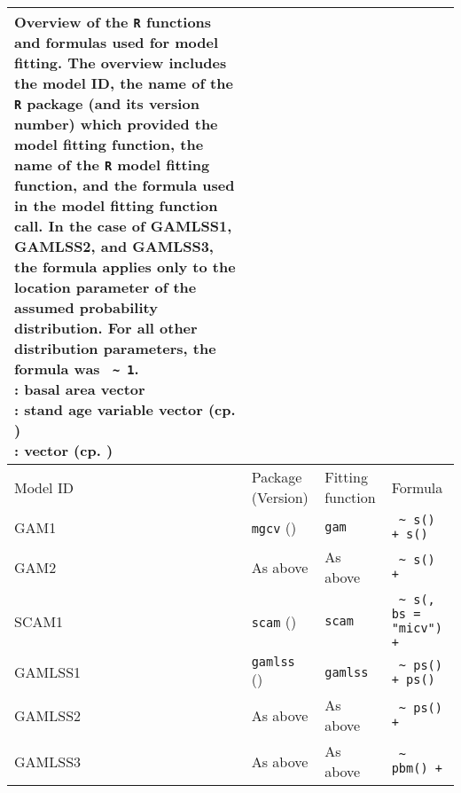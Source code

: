 \begin{table}[H]
  {\tabulinesep=2mm
    \begin{longtabu}{L l l l}
      \caption{Overview of the \texttt{R} functions and formulas used for model fitting. The overview includes
        the model ID,
        the name of the \texttt{R} package (and its version number) which provided the model fitting function,
        the name of the \texttt{R} model fitting function,
        and the formula used in the model fitting function call.
        In the case of GAMLSS1, GAMLSS2, and GAMLSS3, the formula applies only to the location parameter of the assumed probability distribution.
        For all other distribution parameters, the formula was \texttt{\BasalAreaR{} \textasciitilde{} 1}. \\
        \BasalAreaR{}: basal area vector \\
        \StandAgeVariableR{}: stand age variable vector (cp. ) \\
        \ProductivityIndexVariableR{}: \ProductivityIndexVariableText{} vector (cp. )
        \label{tab:PresentedModelsOverviewFormulas}} \\
      \toprule
      Model ID & Package (Version) & Fitting function & Formula \\
      \midrule
      \endhead
      \bottomrule
      \endlastfoot
      GAM1 & \texttt{mgcv} (\mgcvPackageVersion{}) & \texttt{gam} & \texttt{\BasalAreaR{} \textasciitilde{} s(\StandAgeVariableR{}) + s(\ProductivityIndexVariableR{})} \\
      GAM2 & As above & As above & \texttt{\BasalAreaR{} \textasciitilde{} s(\StandAgeVariableR{}) + \ProductivityIndexVariableR{}} \\
      SCAM1 & \texttt{scam} (\scamPackageVersion{}) & \texttt{scam} & \texttt{\BasalAreaR{} \textasciitilde{} s(\StandAgeVariableR{}, bs = "micv") + \ProductivityIndexVariableR{}} \\
      GAMLSS1 & \texttt{gamlss} (\gamlssPackageVersion{}) & \texttt{gamlss} & \texttt{\BasalAreaR{} \textasciitilde{} ps(\StandAgeVariableR{}) + ps(\ProductivityIndexVariableR{})} \\
      GAMLSS2 & As above & As above & \texttt{\BasalAreaR{} \textasciitilde{} ps(\StandAgeVariableR{}) + \ProductivityIndexVariableR{}} \\
      GAMLSS3 & As above & As above & \texttt{\BasalAreaR{} \textasciitilde{} pbm(\StandAgeVariableR{}) + \ProductivityIndexVariableR{}} \\
      \bottomrule
    \end{longtabu}}
\end{table}

